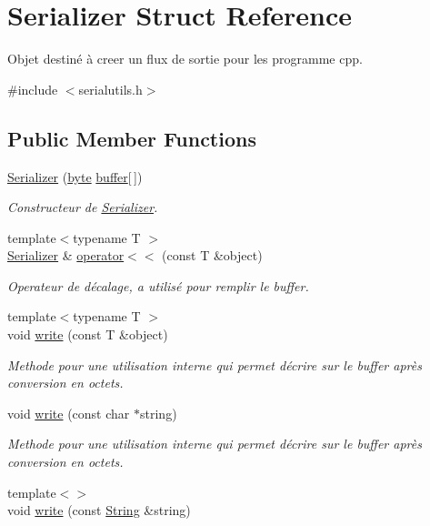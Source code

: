 \hypertarget{struct_serializer}{}\section{Serializer Struct Reference}
\label{struct_serializer}


Objet destiné à creer un flux de sortie pour les programme cpp.  




{\ttfamily \#include $<$serialutils.\+h$>$}

\subsection*{Public Member Functions}
\begin{DoxyCompactItemize}
\item 
\hyperlink{struct_serializer_aff15a74ed17c990475261e4d1319ca7a}{Serializer} (\hyperlink{serialutils_8h_a0c8186d9b9b7880309c27230bbb5e69d}{byte} \hyperlink{struct_serializer_a2c1edbc67c09dcfffe63194038fd9566}{buffer}\mbox{[}$\,$\mbox{]})
\begin{DoxyCompactList}\small\item\em Constructeur de \hyperlink{struct_serializer}{Serializer}. \end{DoxyCompactList}\item 
{\footnotesize template$<$typename T $>$ }\\\hyperlink{struct_serializer}{Serializer} \& \hyperlink{struct_serializer_a984119e4cc29ca38db4c193b70efe211}{operator$<$$<$} (const T \&object)
\begin{DoxyCompactList}\small\item\em Operateur de décalage, a utilisé pour remplir le buffer. \end{DoxyCompactList}\item 
{\footnotesize template$<$typename T $>$ }\\void \hyperlink{struct_serializer_a1ee0f154ba82fc4cfb1bf596debc69d4}{write} (const T \&object)
\begin{DoxyCompactList}\small\item\em Methode pour une utilisation interne qui permet d\textquotesingle{}écrire sur le buffer après conversion en octets. \end{DoxyCompactList}\item 
void \hyperlink{struct_serializer_ac0afd6edf14f126f8c7f95d670d83d0b}{write} (const char $\ast$string)
\begin{DoxyCompactList}\small\item\em Methode pour une utilisation interne qui permet d\textquotesingle{}écrire sur le buffer après conversion en octets. \end{DoxyCompactList}\item 
{\footnotesize template$<$$>$ }\\void \hyperlink{struct_serializer_a1538c2a1dbc7eca145e370c1a1619d59}{write} (const \hyperlink{serialutils_8h_afbeda3fd1bdc8c37d01bdf9f5c8274ff}{String} \&string)
\end{DoxyCompactItemize}
